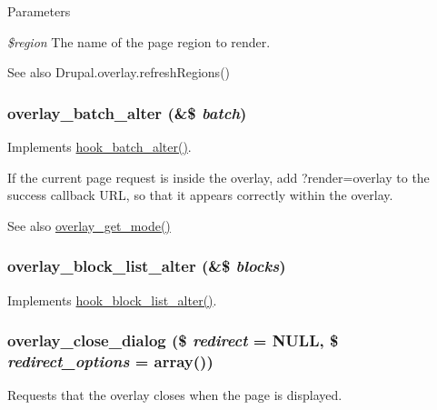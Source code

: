 \begin{DoxyParams}{Parameters}
\item[{\em \$region}]The name of the page region to render.\end{DoxyParams}
\begin{DoxySeeAlso}{See also}
Drupal.overlay.refreshRegions() 
\end{DoxySeeAlso}
\hypertarget{overlay_8module_affb9e486f372808ca4d86fafc675ecb4}{
\subsubsection[{overlay\_\-batch\_\-alter}]{\setlength{\rightskip}{0pt plus 5cm}overlay\_\-batch\_\-alter (\&\$ {\em batch})}}
\label{overlay_8module_affb9e486f372808ca4d86fafc675ecb4}
Implements \hyperlink{group__batch_ga135f2f5d27bc51f905cf9f36bde06a2e}{hook\_\-batch\_\-alter()}.

If the current page request is inside the overlay, add ?render=overlay to the success callback URL, so that it appears correctly within the overlay.

\begin{DoxySeeAlso}{See also}
\hyperlink{overlay_8module_a3d783a955948f187d6777f7671531621}{overlay\_\-get\_\-mode()} 
\end{DoxySeeAlso}
\hypertarget{overlay_8module_a507bf99a50710b798ef39ff0e74b41a8}{
\subsubsection[{overlay\_\-block\_\-list\_\-alter}]{\setlength{\rightskip}{0pt plus 5cm}overlay\_\-block\_\-list\_\-alter (\&\$ {\em blocks})}}
\label{overlay_8module_a507bf99a50710b798ef39ff0e74b41a8}
Implements \hyperlink{group__hooks_gaf38c7633b52b18831e3ec0459d8e9f41}{hook\_\-block\_\-list\_\-alter()}. \hypertarget{overlay_8module_ac3433acbde98b1d6401468c811022264}{
\subsubsection[{overlay\_\-close\_\-dialog}]{\setlength{\rightskip}{0pt plus 5cm}overlay\_\-close\_\-dialog (\$ {\em redirect} = {\ttfamily NULL}, \/  \$ {\em redirect\_\-options} = {\ttfamily array()})}}
\label{overlay_8module_ac3433acbde98b1d6401468c811022264}
Requests that the overlay closes when the page is displayed.


